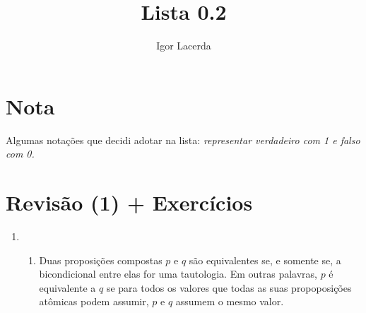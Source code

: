\documentclass[12pt]{article}
\title{Lista 0.2}
\author{Igor Lacerda}
\begin{document}
\maketitle
\section*{Nota}
Algumas notações que decidi adotar na lista: \textit{representar verdadeiro com 1 e falso com 0.}

\section*{Revisão (1) + Exercícios}
\begin{enumerate}
    \item 
        \begin{enumerate}
            \item Duas proposições compostas \( p \) e \( q \) são equivalentes se, e somente se, a bicondicional entre elas for uma tautologia. Em outras palavras, \( p \) é equivalente a \( q\) se para todos os valores que todas as suas propoposições atômicas podem assumir, \( p \) e \( q\) assumem o mesmo valor.


\end{enumerate}
\end{enumerate}
\end{document}
